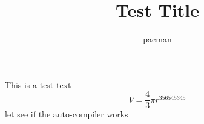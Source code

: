 \documentclass[a4paper]{report}
\title{Test Title}
\author{pacman}
\begin{document}
  This is a test text
  $$V=\frac{4}{3}\pi r^356545345$$
  let see if the auto-compiler works
\end{document}
